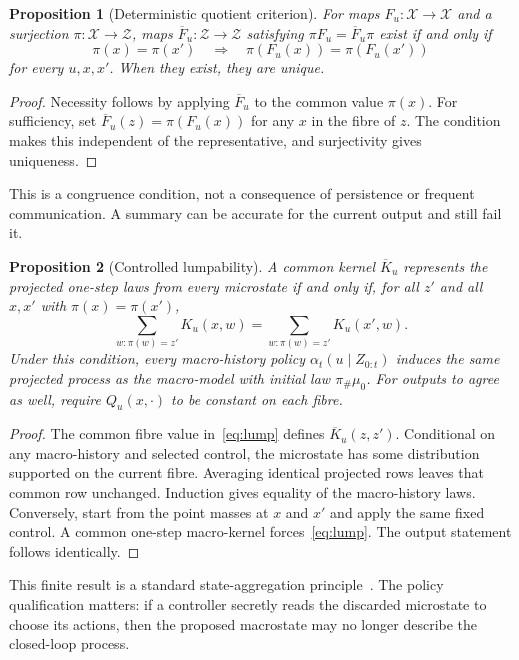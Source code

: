 \documentclass[11pt,letterpaper]{article}
\theoremstyle{plain}
\newtheorem{proposition}{Proposition}[section]
\theoremstyle{definition}
\theoremstyle{remark}
\newcommand{\X}{\mathcal X}
\newcommand{\Z}{\mathcal Z}
\newcommand{\push}{\pi_{\#}}
\begin{document}
\begin{proposition}[Deterministic quotient criterion]\label{prop:det}
For maps $F_u:\X\to\X$ and a surjection $\pi:\X\to\Z$, maps $\overline F_u:\Z\to\Z$ satisfying $\pi F_u=\overline F_u\pi$ exist if and only if
\[
\pi(x)=\pi(x')\quad\Longrightarrow\quad
\pi(F_u(x))=\pi(F_u(x'))
\]
for every $u,x,x'$. When they exist, they are unique.
\end{proposition}
\begin{proof}
Necessity follows by applying $\overline F_u$ to the common value $\pi(x)$. For sufficiency, set $\overline F_u(z)=\pi(F_u(x))$ for any $x$ in the fibre of $z$. The condition makes this independent of the representative, and surjectivity gives uniqueness.
\end{proof}

This is a congruence condition, not a consequence of persistence or frequent communication. A summary can be accurate for the current output and still fail it.

\begin{proposition}[Controlled lumpability]\label{prop:lump}
A common kernel $\overline K_u$ represents the projected one-step laws from every microstate if and only if, for all $z'$ and all $x,x'$ with $\pi(x)=\pi(x')$,
\begin{equation}\label{eq:lump}
\sum_{w:\pi(w)=z'}K_u(x,w)
=\sum_{w:\pi(w)=z'}K_u(x',w).
\end{equation}
Under this condition, every macro-history policy $\alpha_t(u\mid Z_{0:t})$ induces the same projected process as the macro-model with initial law $\push\mu_0$. For outputs to agree as well, require $Q_u(x,\cdot)$ to be constant on each fibre.
\end{proposition}
\begin{proof}
The common fibre value in~\eqref{eq:lump} defines $\overline K_u(z,z')$. Conditional on any macro-history and selected control, the microstate has some distribution supported on the current fibre. Averaging identical projected rows leaves that common row unchanged. Induction gives equality of the macro-history laws. Conversely, start from the point masses at $x$ and $x'$ and apply the same fixed control. A common one-step macro-kernel forces~\eqref{eq:lump}. The output statement follows identically.
\end{proof}

This finite result is a standard state-aggregation principle~\cite{givan}. The policy qualification matters: if a controller secretly reads the discarded microstate to choose its actions, then the proposed macrostate may no longer describe the closed-loop process.
\end{document}
